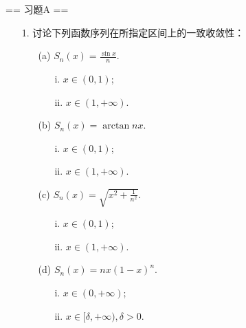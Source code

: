 \newenvironment{solution}{\begin{proofc}[解答]}{\end{proofc}}

== 习题A ==
\begin{enumerate}
    \item[1.]讨论下列函数序列在所指定区间上的一致收敛性：
    \begin{enumerate}
        \item[(a)]\(\displaystyle S_n(x) = \frac{\sin x}{n}\).
            \begin{enumerate}
                \item[i.]\(x \in (0, 1)\);
                \item[ii.]\(x \in (1, +\infty)\).
            \end{enumerate}
        \item[(b)]\(\displaystyle S_n(x) = \arctan nx\).
            \begin{enumerate}
                \item[i.]\(x \in (0, 1)\);
                \item[ii.]\(x \in (1, +\infty)\).
            \end{enumerate}
        \item[(c)]\(\displaystyle S_n(x) = \sqrt{x^2 + \frac{1}{n^2}}\).
            \begin{enumerate}
                \item[i.]\(x \in (0, 1)\);
                \item[ii.]\(x \in (1, +\infty)\).
            \end{enumerate}
        \item[(d)]\(\displaystyle S_n(x) = nx(1-x)^n\).
            \begin{enumerate}
                \item[i.]\(x \in (0, +\infty)\);
                \item[ii.]\(x \in [\delta, +\infty), \delta > 0\).

\end{enumerate}
\end{enumerate}
\end{enumerate}
